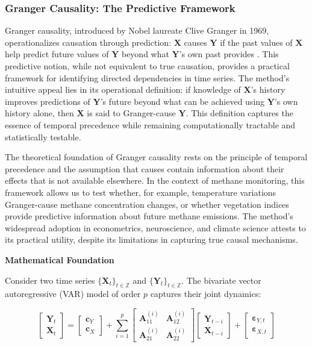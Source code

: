 \subsubsection{Granger Causality: The Predictive Framework}

Granger causality, introduced by Nobel laureate Clive Granger in 1969, operationalizes causation through prediction: $\mathbf{X}$ causes $\mathbf{Y}$ if the past values of $\mathbf{X}$ help predict future values of $\mathbf{Y}$ beyond what $\mathbf{Y}$'s own past provides \cite{Granger}. This predictive notion, while not equivalent to true causation, provides a practical framework for identifying directed dependencies in time series. The method's intuitive appeal lies in its operational definition: if knowledge of $\mathbf{X}$'s history improves predictions of $\mathbf{Y}$'s future beyond what can be achieved using $\mathbf{Y}$'s own history alone, then $\mathbf{X}$ is said to Granger-cause $\mathbf{Y}$. This definition captures the essence of temporal precedence while remaining computationally tractable and statistically testable.

The theoretical foundation of Granger causality rests on the principle of temporal precedence and the assumption that causes contain information about their effects that is not available elsewhere. In the context of methane monitoring, this framework allows us to test whether, for example, temperature variations Granger-cause methane concentration changes, or whether vegetation indices provide predictive information about future methane emissions. The method's widespread adoption in econometrics, neuroscience, and climate science attests to its practical utility, despite its limitations in capturing true causal mechanisms.

\textbf{Mathematical Foundation}

Consider two time series $\{\mathbf{X}_t\}_{t \in \mathbb{Z}}$ and $\{\mathbf{Y}_t\}_{t \in \mathbb{Z}}$. The bivariate vector autoregressive (VAR) model of order $p$ captures their joint dynamics:

\begin{equation}
	\begin{bmatrix} \mathbf{Y}_t \\ \mathbf{X}_t \end{bmatrix} = \begin{bmatrix} \mathbf{c}_Y \\ \mathbf{c}_X \end{bmatrix} + \sum_{i=1}^{p} \begin{bmatrix} \mathbf{A}_{11}^{(i)} & \mathbf{A}_{12}^{(i)} \\ \mathbf{A}_{21}^{(i)} & \mathbf{A}_{22}^{(i)} \end{bmatrix} \begin{bmatrix} \mathbf{Y}_{t-i} \\ \mathbf{X}_{t-i} \end{bmatrix} + \begin{bmatrix} \boldsymbol{\varepsilon}_{Y,t} \\ \boldsymbol{\varepsilon}_{X,t} \end{bmatrix}
\end{equation}


